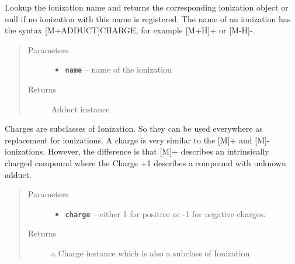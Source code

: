 \documentclass[letterpaper,10pt,openany,oneside]{sphinxmanual}
\begin{document}

\begin{fulllineitems}
\label{library:de.unijena.bioinf.sirius.getIonization(String)}
Lookup the ionization name and returns the corresponding ionization object or null if no ionization with this name is registered. The name of an ionization has the syntax {[}M+ADDUCT{]}CHARGE, for example {[}M+H{]}+ or {[}M-H{]}-.
\begin{quote}\begin{description}
\item[{Parameters}] \leavevmode\begin{itemize}
\item {} 
\textbf{\texttt{name}} -- name of the ionization

\end{itemize}

\item[{Returns}] \leavevmode
Adduct instance

\end{description}\end{quote}

\end{fulllineitems}


\begin{fulllineitems}
\label{library:de.unijena.bioinf.sirius.getCharge(int)}
Charges are subclasses of Ionization. So they can be used everywhere as replacement for ionizations. A charge is very similar to the {[}M{]}+ and {[}M{]}- ionizations. However, the difference is that {[}M{]}+ describes an intrinsically charged compound where the Charge +1 describes a compound with unknown adduct.
\begin{quote}\begin{description}
\item[{Parameters}] \leavevmode\begin{itemize}
\item {} 
\textbf{\texttt{charge}} -- either 1 for positive or -1 for negative charges.

\end{itemize}

\item[{Returns}] \leavevmode
a Charge instance which is also a subclass of Ionization

\end{description}\end{quote}

\end{fulllineitems}
\end{document}
